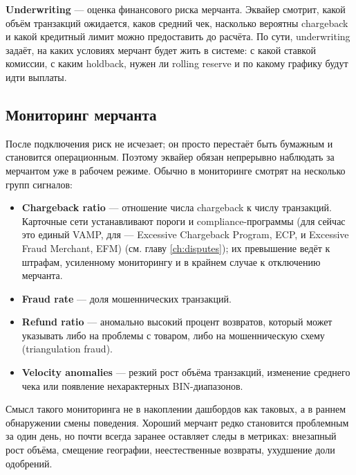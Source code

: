 \textbf{Underwriting} --- оценка финансового риска мерчанта.
Эквайер смотрит, какой объём транзакций ожидается, каков средний
чек, насколько вероятны chargeback и какой кредитный лимит
можно предоставить до расчёта. По сути, underwriting задаёт,
на каких условиях мерчант будет жить в системе: с какой ставкой
комиссии, с каким holdback, нужен ли rolling reserve и по какому
графику будут идти выплаты.\cite{visa-payment-facilitator-marketplace-risk-guide}

\subsection*{Мониторинг мерчанта}

После подключения риск не исчезает; он просто перестаёт быть
бумажным и становится операционным. Поэтому эквайер обязан
непрерывно наблюдать за мерчантом уже в рабочем режиме.
Обычно в мониторинге смотрят на несколько групп сигналов:

\begin{itemize}
  \item \textbf{Chargeback ratio} --- отношение числа chargeback
        к числу транзакций. Карточные сети устанавливают пороги
        и compliance-программы (для  сейчас это единый
        VAMP, для  --- Excessive Chargeback
        Program, ECP, и Excessive Fraud Merchant, EFM)
        (см. главу \ref{ch:disputes});
        их превышение ведёт к штрафам, усиленному мониторингу
        и в крайнем случае к отключению мерчанта.\cite{visa-vamp-intro,mc-compliance-programs}
  \item \textbf{Fraud rate} --- доля мошеннических транзакций.
  \item \textbf{Refund ratio} --- аномально высокий процент
        возвратов, который может указывать либо на проблемы
        с товаром, либо на мошенническую схему
        (triangulation fraud).
  \item \textbf{Velocity anomalies} --- резкий рост объёма
        транзакций, изменение среднего чека или появление
        нехарактерных BIN-диапазонов.
\end{itemize}

Смысл такого мониторинга не в накоплении дашбордов как таковых,
а в раннем обнаружении смены поведения. Хороший мерчант редко
становится проблемным за один день, но почти всегда заранее
оставляет следы в метриках: внезапный рост объёма, смещение
географии, неестественные возвраты, ухудшение доли одобрений.\cite{visa-payment-facilitator-marketplace-risk-guide}

